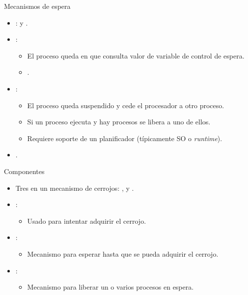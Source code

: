 \begin{frame}[t]{Mecanismos de espera}
\begin{itemize}
  \item {}:  y .

  \item {}:
    \begin{itemize}
      \item El proceso queda en  que  
            consulta valor de variable de control de espera.
      \item {}.
    \end{itemize}

  \item {}:
    \begin{itemize}
      \item El proceso queda suspendido y cede el procesador a otro proceso.
      \item Si un proceso ejecuta  y hay procesos 
             se libera a uno de ellos.
      \item Requiere soporte de un planificador (típicamente SO o \emph{runtime}).
    \end{itemize}

  \item {}.
\end{itemize}
\end{frame}

\begin{frame}[t]{Componentes}
\begin{itemize}
  \item Tres  en un mecanismo de cerrojos:
        ,  y .

  \item {}:
    \begin{itemize}
      \item Usado para intentar adquirir el cerrojo.
    \end{itemize}

  \item {}:
    \begin{itemize}
      \item Mecanismo para esperar hasta que se pueda adquirir el cerrojo.
    \end{itemize}

  \item {}:
    \begin{itemize}
      \item Mecanismo para liberar un o varios procesos en espera.
    \end{itemize}
\end{itemize}
\end{frame}

